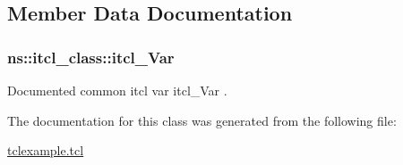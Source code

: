 \subsection{Member Data Documentation}
\hypertarget{classns_1_1itcl__class_a8df46696ce554fed04d170932260fbb8}{
\subsubsection[{itcl\-\_\-\-Var}]{\setlength{\rightskip}{0pt plus 5cm}ns\-::itcl\-\_\-class\-::itcl\-\_\-\-Var\hspace{0.3cm}{\ttfamily [static]}}}\label{classns_1_1itcl__class_a8df46696ce554fed04d170932260fbb8}
Documented common itcl var {\ttfamily itcl\-\_\-\-Var} . 

The documentation for this class was generated from the following file\-:\begin{DoxyCompactItemize}
\item 
\hyperlink{tclexample_8tcl}{tclexample.\-tcl}\end{DoxyCompactItemize}
